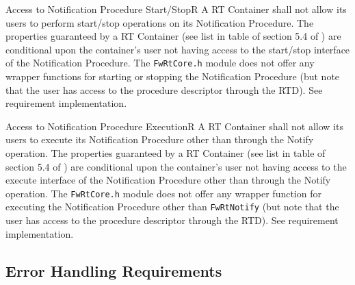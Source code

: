 \documentclass[a4paper,10pt]{article}
\newenvironment{fw_req}[6]
{\addtocounter{subsubsection}{1}
	\hspace{0.2cm}\textbf{FW-\arabic{section}.\arabic{subsection}.\arabic{subsubsection}/#2
	\hspace{0.8cm} #1}
	\vspace{-10pt}
\begin{longtable}{p{2.7cm}P{8.5cm}}
\hline
\textsc{Requirement} & #3 \\
\textsc{Justification} & #4 \\
\textsc{Implementation} & #5  \\ 
\textsc{Verification} & #6  \\
\hline
}
{\end{longtable}}
\begin{document}
\begin{fw_req}{Access to Notification Procedure Start/Stop}{R}
{A RT Container shall not allow its users to perform start/stop operations on its Notification Procedure.}
{The properties guaranteed by a RT Container (see list in table of section 5.4 of \cite{ref:fwprofile}) are conditional upon the container's user not having access to the start/stop interface of the Notification Procedure. }
{The \texttt{FwRtCore.h} module does not offer any wrapper functions for starting or stopping the Notification Procedure (but note that the user has access to the procedure descriptor through the RTD).} 
{See requirement implementation.}
\end{fw_req}

\begin{fw_req}{Access to Notification Procedure Execution}{R}
{A RT Container shall not allow its users to execute its Notification Procedure other than through the Notify operation.}
{The properties guaranteed by a RT Container (see list in table of section 5.4 of \cite{ref:fwprofile}) are conditional upon the container's user not having access to the execute interface of the Notification Procedure other than through the Notify operation. }
{The \texttt{FwRtCore.h} module does not offer any wrapper function for executing the Notification Procedure other than \texttt{FwRtNotify} (but note that the user has access to the procedure descriptor through the RTD).} 
{See requirement implementation.}
\end{fw_req}

\subsection{Error Handling Requirements}\label{req:errorCodeRT}
\end{document}
